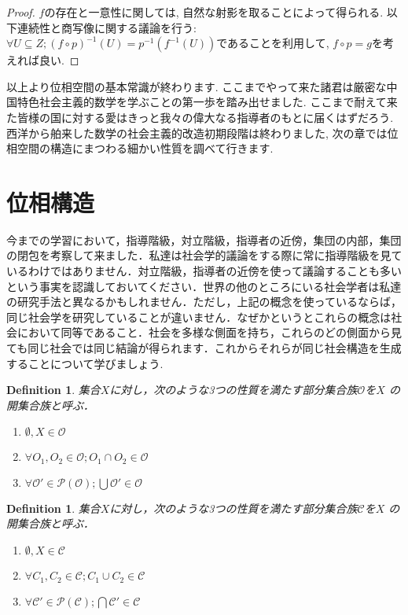 \documentclass[dvipdfmx]{jbook}
\newtheorem{definition}[theorem]{Definition}
\theoremstyle{remark}
\theoremstyle{plain}
\begin{document}
\begin{proof}%
	$f$の存在と一意性に関しては, 自然な射影を取ることによって得られる. 以下連続性と商写像に関する議論を行う:
	 $\forall U \subseteq Z; \left( f\circ p \right) ^{-1}(U) = p^{-1}(f^{-1}(U))$であることを利用して, $f\circ p =g$を考えれば良い. 
\end{proof}

以上より位相空間の基本常識が終わります. ここまでやって来た諸君は厳密な中国特色社会主義的数学を学ぶことの第一歩を踏み出せました. ここまで耐えて来た皆様の国に対する愛はきっと我々の偉大なる指導者のもとに届くはずだろう. 西洋から舶来した数学の社会主義的改造初期段階は終わりました, 次の章では位相空間の構造にまつわる細かい性質を調べて行きます.

\section{位相構造}
今までの学習において，指導階級，対立階級，指導者の近傍，集団の内部，集団の閉包を考察して来ました．私達は社会学的議論をする際に常に指導階級を見ているわけではありません．対立階級，指導者の近傍を使って議論することも多いという事実を認識しておいてください．世界の他のところにいる社会学者は私達の研究手法と異なるかもしれません．ただし，上記の概念を使っているならば，同じ社会学を研究していることが違いません．なぜかというとこれらの概念は社会において同等であること．社会を多様な側面を持ち，これらのどの側面から見ても同じ社会では同じ結論が得られます．これからそれらが同じ社会構造を生成することについて学びましょう.

\begin{definition}
	集合$X$に対し，次のような3つの性質を満たす部分集合族$\mathcal{O}$を$X$ の開集合族と呼ぶ．
	\begin{enumerate}
		\item $\emptyset , X \in \mathcal{O}$ 
	\item $\forall O_1, O_2 \in  \mathcal{O} ;O_1 \cap O_2 \in \mathcal{O}$ 
		\item $\forall \mathcal{O}' \in \mathcal{P}(\mathcal{O}); \bigcup \mathcal{O}' \in \mathcal{O} $
	\end{enumerate}
\end{definition}

\begin{definition}
	集合$X$に対し，次のような3つの性質を満たす部分集合族$\mathcal{C}$を$X$ の開集合族と呼ぶ．
	\begin{enumerate}
		\item $\emptyset ,X \in \mathcal{C}$ 
		\item $\forall C_1 , C_2 \in  \mathcal{C}; C_1 \cup C_2 \in \mathcal{C}$ 
		\item $\forall \mathcal{C}' \in \mathcal{P}(\mathcal{C}); \bigcap \mathcal{C}' \in \mathcal{C} $

	\end{enumerate}
\end{definition}
\end{document}
